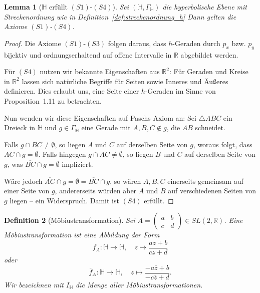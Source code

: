 \documentclass[a4paper,12pt]{article}
\theoremstyle{break}
\newtheorem{definition}{Definition}[section]
\newtheorem{lemma}[definition]{Lemma}
\begin{document}
\begin{lemma}[$\mathbb{H}$ erfüllt \((S1)\)-\((S4)\)]
Sei $(\mathbb{H}, \Gamma_{\mathbb{H}})$ die hyperbolische Ebene mit Streckenordnung wie in Definition~\ref{def:streckenordnung_h} Dann gelten die Axiome \((S1)\)-\((S4)\).
\end{lemma}

\begin{proof}
Die Axiome \((S1)\)-\((S3)\) folgen daraus, dass \(h\)-Geraden durch \( p_x \) bzw. \( p_y \) bijektiv und ordnungserhaltend auf offene Intervalle in \( \mathbb{R} \) abgebildet werden.

Für \((S4)\) nutzen wir bekannte Eigenschaften aus \( \mathbb{R}^2 \): Für Geraden und Kreise in \( \mathbb{R}^2 \) lassen sich natürliche Begriffe für Seiten sowie Inneres und Äußeres definieren. Dies erlaubt uns, eine Seite einer \(h\)-Geraden im Sinne von Proposition~1.11 zu betrachten.

Nun wenden wir diese Eigenschaften auf Paschs Axiom an: Sei \( \triangle ABC \) ein Dreieck in \( \mathbb{H} \) und \( g \in \Gamma_{\mathbb{H}} \) eine Gerade mit \( A, B, C \notin g \), die \( \overline{AB} \) schneidet. 

Falls \( g \cap \overline{BC} \neq \emptyset \), so liegen \( A \) und \( C \) auf derselben Seite von \( g \), woraus folgt, dass \( \overline{AC} \cap g = \emptyset \).  
Falls hingegen \( g \cap \overline{AC} \neq \emptyset \), so liegen \( B \) und \( C \) auf derselben Seite von \( g \), was \( \overline{BC} \cap g = \emptyset \) impliziert.  

Wäre jedoch \( \overline{AC} \cap g = \emptyset = \overline{BC} \cap g \), so wären \( A, B, C \) einerseits gemeinsam auf einer Seite von \( g \), andererseits würden aber \( A \) und \( B \) auf verschiedenen Seiten von \( g \) liegen – ein Widerspruch.  
Damit ist \((S4)\) erfüllt.
\end{proof}

\begin{definition}[Möbiustransformation]
Sei \( A = \begin{pmatrix} a & b \\ c & d \end{pmatrix} \in SL(2, \mathbb{R}) \).  
Eine \emph{Möbiustransformation} ist eine Abbildung der Form  
\[
f_A: \mathbb{H} \to \mathbb{H}, \quad z \mapsto \frac{az + b}{cz + d}
\]
oder  
\[
\overline{f}_A: \mathbb{H} \to \mathbb{H}, \quad z \mapsto \frac{-a\overline{z} + b}{-c\overline{z} + d}.
\]
Wir bezeichnen mit \( I_{\mathbb{H}} \) die Menge aller Möbiustransformationen.
\end{definition}
\end{document}
